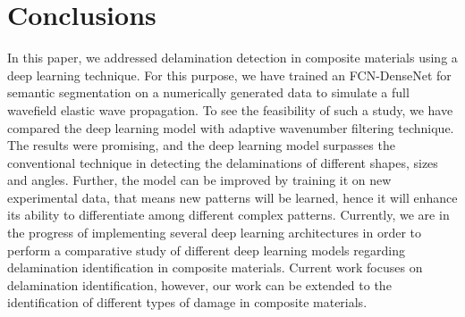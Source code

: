 \section{Conclusions}
In this paper, we addressed delamination detection in composite materials using a deep learning technique. 
For this purpose, we have trained an FCN-DenseNet for semantic segmentation on a numerically generated data to simulate a full wavefield elastic wave propagation.
To see the feasibility of such a study, we have compared the deep learning model with adaptive wavenumber filtering technique.
The results were promising, and the deep learning model surpasses the conventional technique in detecting the delaminations of different shapes, sizes and angles. 
Further, the model can be improved by training it on new experimental data, that means new patterns will be learned, hence it will enhance its ability to differentiate among different complex patterns.
Currently, we are in the progress of implementing several deep learning architectures in order to perform a comparative study of different deep learning models regarding delamination identification in composite materials.
Current work focuses on delamination identification, however, our work can be extended to the identification of different types of damage in composite materials.
